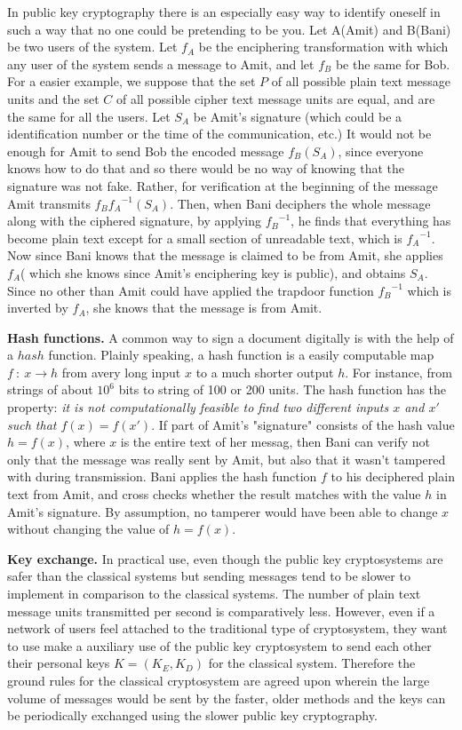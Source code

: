 \documentclass[12pt]{article}
\begin{document}
In public key cryptography there is an especially easy way to identify oneself in such a way that no one could be pretending to be you. Let A(Amit) and B(Bani) be two users of the system. Let $f_A$ be the enciphering transformation with which any user of the system sends a message to Amit, and let $f_B$ be the same for Bob. For a easier example, we suppose that the set $P$ of all possible plain text message units and the set $C$ of all possible cipher text message units are equal, and are the same for all the users. Let $S_A$ be Amit's signature (which could be a identification number or the time of the communication, etc.) It would not be enough for Amit to send Bob the encoded message $f_B(S_A)$, since everyone knows how to do that and so there would be no way of knowing that the signature was not fake. Rather, for verification at the beginning of the message Amit transmits $f_B{f_A}^{-1}(S_A)$. Then, when Bani deciphers the whole message along with the ciphered signature, by applying ${f_B}^{-1}$, he finds that everything has become plain text except for a small section of unreadable text, which is ${f_A}^{-1}$. Now since Bani knows that the message is claimed to be from Amit, she applies $f_A$( which she knows since Amit's enciphering key is public), and obtains $S_A$. Since no other than Amit could have applied the trapdoor function ${f_B}^{-1}$ which is inverted by $f_A$, she knows that the message is from Amit.

\textbf{Hash functions.} A common way to sign a document digitally is with  the help of a $hash$ function. Plainly speaking, a hash function is a easily computable map $f \: : \: x \rightarrow h$ from avery long input $x$ to a much shorter output $h$. For instance, from strings of about $10^6$ bits to string of 100 or 200 units. The hash function has the property: \textit{it is not computationally feasible to find two different inputs $x$ and $x'$ such that $f(x)=f(x')$}. If part of Amit's "signature" consists of the hash value $h=f(x)$, where $x$ is the entire text of her messag, then Bani can verify not only that the message was really sent by Amit, but also that it wasn't tampered with during transmission. Bani applies the hash function $f$ to his deciphered plain text from Amit, and cross checks whether the result matches with the value $h$ in Amit's signature. By assumption, no tamperer would have been able to change $x$ without changing the value of $h=f(x)$.

\textbf{Key exchange.} In practical use, even though the public key cryptosystems are safer than the classical systems but sending messages tend to be slower to implement in comparison to the classical systems. The number of plain text message units transmitted per second is comparatively less. However, even if a network of users feel attached to the traditional type of cryptosystem, they want to use make a auxiliary use of the public key cryptosystem to send each other their personal keys $K=(K_E,K_D)$ for the classical system. Therefore the ground rules for the classical cryptosystem are agreed upon wherein the large volume of messages would be sent by the faster, older methods and the keys can  be periodically exchanged using the slower public key cryptography.
\end{document}
